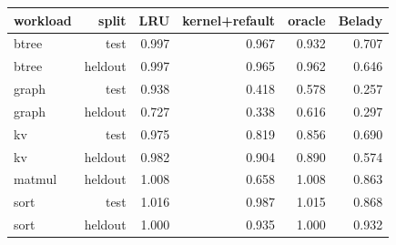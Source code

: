 \begin{tabular}{lrrrrr}
\toprule
workload & split & LRU & kernel{+}refault & oracle & Belady \\
\midrule
btree & test & 0.997 & 0.967 & 0.932 & 0.707 \\
btree & heldout & 0.997 & 0.965 & 0.962 & 0.646 \\
graph & test & 0.938 & 0.418 & 0.578 & 0.257 \\
graph & heldout & 0.727 & 0.338 & 0.616 & 0.297 \\
kv & test & 0.975 & 0.819 & 0.856 & 0.690 \\
kv & heldout & 0.982 & 0.904 & 0.890 & 0.574 \\
matmul & heldout & 1.008 & 0.658 & 1.008 & 0.863 \\
sort & test & 1.016 & 0.987 & 1.015 & 0.868 \\
sort & heldout & 1.000 & 0.935 & 1.000 & 0.932 \\
\bottomrule
\end{tabular}
